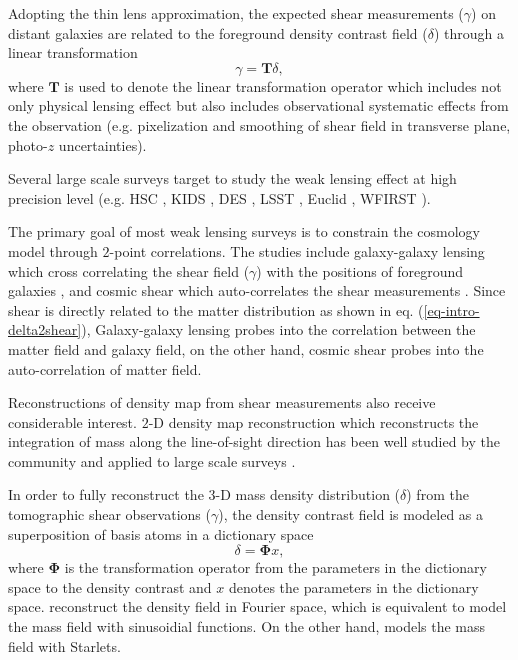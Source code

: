 \documentclass[twocolumn]{aastex62}
\begin{document}
Adopting the thin lens approximation, the expected shear measurements ($\gamma$) on distant galaxies are related to the 
foreground density contrast field ($\delta$) through a linear transformation
\begin{equation} \label{eq-intro-delta2shear}
 \gamma=\mathbf{T} \delta,
\end{equation}
where $\mathbf{T}$ is used to denote the linear transformation operator which includes not only physical lensing effect
but also includes observational systematic effects from the observation (e.g. pixelization and smoothing of shear field in
transverse plane, photo-$z$ uncertainties).

Several large scale surveys target to study the weak lensing effect at high precision level (e.g. HSC \citep{HSC1-data}, KIDS
\citep{KIDS13}, DES \citep{DES05}, LSST \citep{LSSTScienceBook}, Euclid \citep{Euclid2011}, WFIRST \citep{WFIRST15}).

The primary goal of most weak lensing surveys is to constrain the cosmology model through $2$-point correlations. The studies
include galaxy-galaxy lensing which cross correlating the shear field ($\gamma$) with the positions of foreground galaxies
\citep{gglens-GAMA-Han2014,gglens-BossCFHTMore2015,gglens-DES1},
and cosmic shear which auto-correlates the shear measurements
\citep{cosmicShearRealKids450,cosmicShear-DES1,cosmicShear_HSC1_Chiaki2019,cosmicShear_HSC1_Hamana2019}.
Since shear is directly related to the matter distribution as shown in eq. (\ref{eq-intro-delta2shear}), Galaxy-galaxy lensing
probes into the correlation between the matter field and galaxy field, on the other hand, cosmic shear probes into the
auto-correlation of matter field.

Reconstructions of density map from shear measurements also receive considerable interest. $2$-D density map reconstruction 
which reconstructs the integration of mass along the line-of-sight direction has been well studied by the community
\citep{massMap-KS1993,WL-massMap-Glimpse2D-Lanusse2016}
and applied to large scale surveys \citep{HSC1-massMaps,massMapDES-Chang2018,DES-SV-massMap-sparsity}.

In order to fully reconstruct the $3$-D mass density distribution ($\delta$) from the tomographic shear observations ($\gamma$),
the density contrast field is modeled as a superposition of basis atoms in a dictionary space
\begin{equation} \label{eq-intro-dict}
 \delta= \mathbf{\Phi} x,
\end{equation}
where $\mathbf{\Phi}$ is the transformation operator from the parameters in the dictionary space to the density contrast 
and $x$ denotes the parameters in the dictionary space. \citet{LSS-massMap-Wiener-Simon2009} reconstruct the density field
in Fourier space, which is equivalent to model the mass field with sinusoidial functions. On the other hand,
\citet{LSS-massMap-Glimpse3D-Leonard2014} models the mass field with Starlets.
\end{document}
